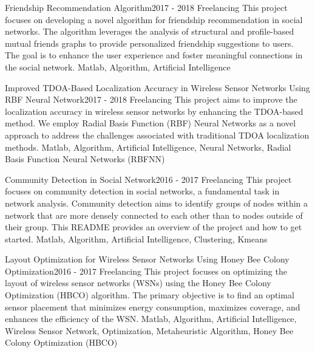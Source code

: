 
\begin{projects}
	\project
	{Friendship Recommendation Algorithm}{2017 - 2018}
	{ {Freelancing} }
	{This project focuses on developing a novel algorithm for friendship recommendation in social networks. The algorithm leverages the analysis of structural and profile-based mutual friends graphs to provide personalized friendship suggestions to users. The goal is to enhance the user experience and foster meaningful connections in the social network.}
	{Matlab, Algorithm, Artificial Intelligence}
				
	\project
	{Improved TDOA-Based Localization Accuracy in Wireless Sensor Networks Using RBF Neural Network}{2017 - 2018}
	{ {Freelancing} }
	{This project aims to improve the localization accuracy in wireless sensor networks by enhancing the TDOA-based method. We employ Radial Basis Function (RBF) Neural Networks as a novel approach to address the challenges associated with traditional TDOA localization methods.}
	{Matlab, Algorithm, Artificial Intelligence, Neural Networks, Radial Basis Function Neural Networks (RBFNN)}

	\project
	{Community Detection in Social Network}{2016 - 2017}
	{ {Freelancing} }
	{This project focuses on community detection in social networks, a fundamental task in network analysis. Community detection aims to identify groups of nodes within a network that are more densely connected to each other than to nodes outside of their group. This README provides an overview of the project and how to get started.}
	{Matlab, Algorithm, Artificial Intelligence, Clustering, Kmeans}

	\project
	{Layout Optimization for Wireless Sensor Networks Using Honey Bee Colony Optimization}{2016 - 2017}
	{ {Freelancing} }
	{This project focuses on optimizing the layout of wireless sensor networks (WSNs) using the Honey Bee Colony Optimization (HBCO) algorithm. The primary objective is to find an optimal sensor placement that minimizes energy consumption, maximizes coverage, and enhances the efficiency of the WSN.}
	{Matlab, Algorithm, Artificial Intelligence, Wireless Sensor Network, Optimization, Metaheuristic Algorithm, Honey Bee Colony Optimization (HBCO)}
	

\end{projects}
